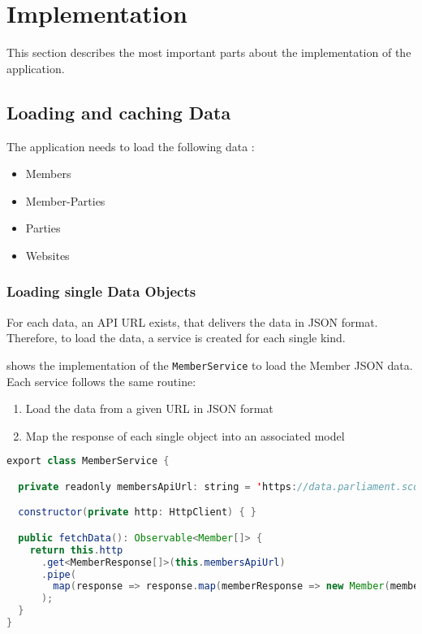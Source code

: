 \section{Implementation}\label{sec:02_impl}
This section describes the most important parts about the implementation of the application.

\subsection{Loading and caching Data}\label{subsec:02_impl_data}
The application needs to load the following data :
\begin{itemize}
\item Members
\item Member-Parties
\item Parties
\item Websites
\end{itemize}

\subsubsection{Loading single Data Objects}\label{subsubsec:02_impl_data_loading}
For each data, an API URL exists, that delivers the data in JSON format. Therefore, to load the data, a service is created for each single kind.

 shows the implementation of the \texttt{MemberService} to load the Member JSON data. Each service follows the same routine:
\begin{enumerate}
\item Load the data from a given URL in JSON format
\item Map the response of each single object into an associated model
\end{enumerate}
\begin{lstlisting}[label=lst:02_impl_data_memberservice, caption=\texttt{MemberService} implementation, language=java]
export class MemberService {

  private readonly membersApiUrl: string = 'https://data.parliament.scot/api/members';

  constructor(private http: HttpClient) { }

  public fetchData(): Observable<Member[]> {
    return this.http
      .get<MemberResponse[]>(this.membersApiUrl)
      .pipe(
        map(response => response.map(memberResponse => new Member(memberResponse)))
      );
  }
}
\end{lstlisting}

